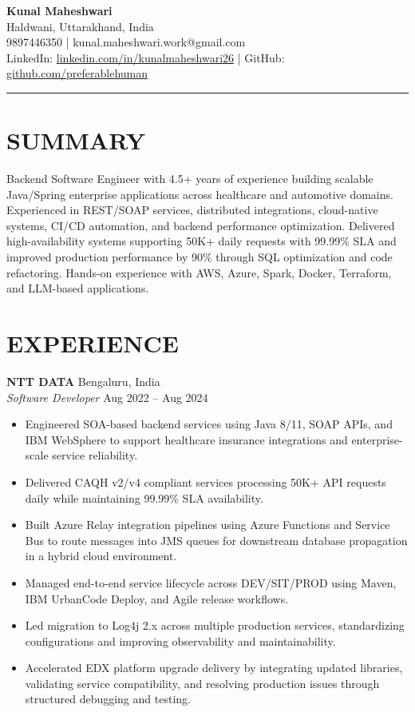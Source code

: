 \documentclass[11pt]{article}
\begin{document}
{\LARGE \textbf{Kunal Maheshwari}} \\
Haldwani, Uttarakhand, India \\
9897446350 \quad | \quad kunal.maheshwari.work@gmail.com \\
LinkedIn: \href{https://www.linkedin.com/in/kunalmaheshwari26}{linkedin.com/in/kunalmaheshwari26} \quad | \quad
GitHub: \href{https://github.com/preferablehuman}{github.com/preferablehuman}

\vspace{4pt}
\hrule
\vspace{4pt}

\section*{SUMMARY}
Backend Software Engineer with 4.5+ years of experience building scalable Java/Spring enterprise applications across healthcare and automotive domains. Experienced in REST/SOAP services, distributed integrations, cloud-native systems, CI/CD automation, and backend performance optimization. Delivered high-availability systems supporting 50K+ daily requests with 99.99\% SLA and improved production performance by 90\% through SQL optimization and code refactoring. Hands-on experience with AWS, Azure, Spark, Docker, Terraform, and LLM-based applications.

\section*{EXPERIENCE}

\textbf{NTT DATA} \hfill Bengaluru, India \\
\textit{Software Developer} \hfill Aug 2022 -- Aug 2024

\begin{itemize}
    \item Engineered SOA-based backend services using Java 8/11, SOAP APIs, and IBM WebSphere to support healthcare insurance integrations and enterprise-scale service reliability.
    \item Delivered CAQH v2/v4 compliant services processing 50K+ API requests daily while maintaining 99.99\% SLA availability.
    \item Built Azure Relay integration pipelines using Azure Functions and Service Bus to route messages into JMS queues for downstream database propagation in a hybrid cloud environment.
    \item Managed end-to-end service lifecycle across DEV/SIT/PROD using Maven, IBM UrbanCode Deploy, and Agile release workflows.
    \item Led migration to Log4j 2.x across multiple production services, standardizing configurations and improving observability and maintainability.
    \item Accelerated EDX platform upgrade delivery by integrating updated libraries, validating service compatibility, and resolving production issues through structured debugging and testing.
\end{itemize}
\end{document}

